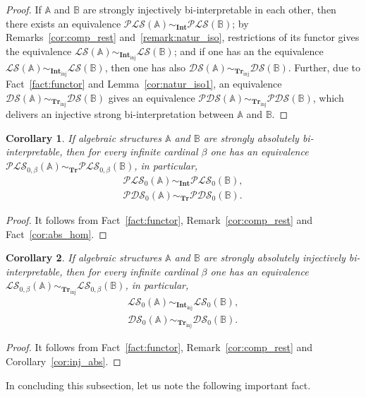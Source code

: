 \documentclass[12pt]{article}
\newtheorem{corollary}{Corollary}
\theoremstyle{definition}
\def\MA{{\mathbb{A}}}
\def\MB{{\mathbb{B}}}
\def\Int{{\mathbf{Int}}}
\def\Tr{{\mathbf{Tr}}}
\newcommand{\Inj}{\mathrm{inj}}
\def\PLS{{\mathcal{PLS}}}
\def\PDS{{\mathcal{PDS}}}
\def\DS{{\mathcal{DS}}}
\def\LS{{\mathcal{LS}}}
\begin{document}
\begin{proof}
If $\MA$ and $\MB$ are strongly injectively bi-interpretable in each other, then there exists an equivalence $\PLS(\MA)\sim_{\Int}\PLS(\MB)$; by Remarks~\ref{cor:comp_rest} and~\ref{remark:natur_iso}, restrictions of its functor gives the equivalence $\LS(\MA)\sim_{\Int_\Inj}\LS(\MB)$; and if one has an the equivalence $\LS(\MA)\sim_{\Int_\Inj}\LS(\MB)$, then one has also $\DS(\MA)\sim_{\Tr_\Inj}\DS(\MB)$. Further, due to Fact~\ref{fact:functor} and Lemma~\ref{cor:natur_iso1}, an equivalence $\DS(\MA)\sim_{\Tr_\Inj}\DS(\MB)$ gives an equivalence $\PDS(\MA)\sim_{\Tr_\Inj}\PDS(\MB)$, which delivers an injective strong bi-interpretation between $\MA$ and $\MB$.
\end{proof}

\begin{corollary}\label{cor:bi2}
If algebraic structures $\MA$ and $\MB$ are strongly absolutely bi-interpretable, then for every infinite cardinal $\beta$ one has an equivalence $\PLS_{0,\beta}(\MA)\sim_{\Tr}\PLS_{0,\beta}(\MB)$, in particular,
\begin{gather*}
\PLS_0(\MA)\sim_{\Int}\PLS_0(\MB),\\
\PDS_0(\MA)\sim_\Tr\PDS_0(\MB).
\end{gather*}
\end{corollary}

\begin{proof}
It follows from Fact~\ref{fact:functor}, Remark~\ref{cor:comp_rest} and Fact~\ref{cor:abs_hom}. 
\end{proof}

\begin{corollary}\label{cor:bi3}
If algebraic structures $\MA$ and $\MB$ are strongly absolutely injectively bi-interpretable, then for every infinite cardinal $\beta$ one has an equivalence $\LS_{0,\beta}(\MA)\sim_{\Tr_\Inj}\LS_{0,\beta}(\MB)$, in particular,
\begin{gather*}
\LS_0(\MA)\sim_{\Int_\Inj}\LS_0(\MB),\\
\DS_0(\MA)\sim_{\Tr_\Inj}\DS_0(\MB).
\end{gather*}
\end{corollary}

\begin{proof}
It follows from Fact~\ref{fact:functor}, Remark~\ref{cor:comp_rest} and Corollary~\ref{cor:inj_abs}. 
\end{proof}

In concluding this subsection, let us note the following important fact.
\end{document}
